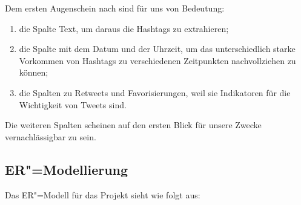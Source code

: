 \documentclass[BCOR0mm,fontsize=12pt,paper=a4,final,numbers=noenddot]{scrartcl}
\begin{document}
Dem ersten Augenschein nach sind für uns von Bedeutung:

\begin{enumerate}[label=\alph*),nosep]
 \item die Spalte Text, um daraus die Hashtags zu extrahieren;
 \item die Spalte mit dem Datum und der Uhrzeit, um das unterschiedlich starke Vorkommen von Hashtags zu verschiedenen Zeitpunkten nachvollziehen zu können;
 \item die Spalten zu Retweets und Favorisierungen, weil sie Indikatoren für die Wichtigkeit von Tweets sind.
\end{enumerate}

Die weiteren Spalten scheinen auf den ersten Blick für unsere Zwecke vernachlässigbar zu sein.


\clearpage

\subsection{ER"=Modellierung}

Das ER"=Modell für das Projekt sieht wie folgt aus:

\bigskip

\usetikzlibrary{positioning}
\usetikzlibrary{shadows}
\end{document}
